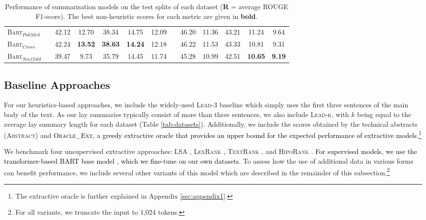 \documentclass[11pt]{article}
\begin{document}
\begin{table*}[ht]
{\begin{tabular}{llccccccccccc}
\hspace{8pt} \textsc{Bart$_{PubMed}$}  && 42.12 & 12.70 & 38.34 & 14.75 & 12.09 && 46.20 & 11.36 & 43.21 & 11.24 & 9.64 \\
           \hspace{8pt} \textsc{Bart$_{Cross}$}  && 42.24 & \textbf{13.52} & \textbf{38.63} & \textbf{14.24} & 12.18  &&  46.22 & 11.53 & 43.33 & 10.81 & 9.31 \\
           \hspace{8pt} \textsc{Bart$_{Scaffold}$}  && 39.47 & 9.73 & 35.79 & 14.45 & 11.74 && 45.28 & 10.99 & 42.51 & \textbf{10.65} & \textbf{9.19} \\ 
\hline
    \end{tabular}
    }
    \caption{Performance of summarisation models on the test splits of each dataset (\textbf{R} = average ROUGE F1-score). The best non-heuristic scores for each metric are given in \textbf{bold}.}
    \label{tab:summ_results}
\end{table*}

\subsection{Baseline Approaches} \label{subsec:results-baselines}
For our heuristics-based approaches, we include the widely-used \textsc{Lead-3} baseline which simply uses the first three sentences of the main body of the text. As our lay summaries typically consist of more than three sentences, we also include \textsc{Lead-k},
with $k$ being equal to the average lay summary length for each dataset (Table \ref{tab:datasets}). Additionally, we include the scores obtained by the technical abstracts (\textsc{Abstract}) and \textcolor{black}{\textsc{Oracle\_Ext}, a greedy extractive oracle \citep{Nallapati2017}
that provides an upper bound for the expected performance of extractive models.}\footnote{The extractive oracle is further explained in Appendix \ref{sec:appendix1}.}


We benchmark four unsupervised extractive approaches: \textsc{LSA} \citep{Steinberger2004}, \textsc{LexRank} \citep{Erkan_2004}, \textsc{TextRank} \citep{mihalcea-tarau-2004-textrank}, and \textsc{HipoRank} \citep{Dong2021-yh}.
\textcolor{black}{For supervised models, we use the transformer-based \textsc{BART} base model \citep{lewis-etal-2020-bart}, which we fine-tune on our own datasets.} 
To assess how the use of additional data in various forms can benefit performance, we include several other variants of this model which are described in the remainder of this subsection.\footnote{For all variants, we truncate the input to 1,024 tokens.}
\end{document}
